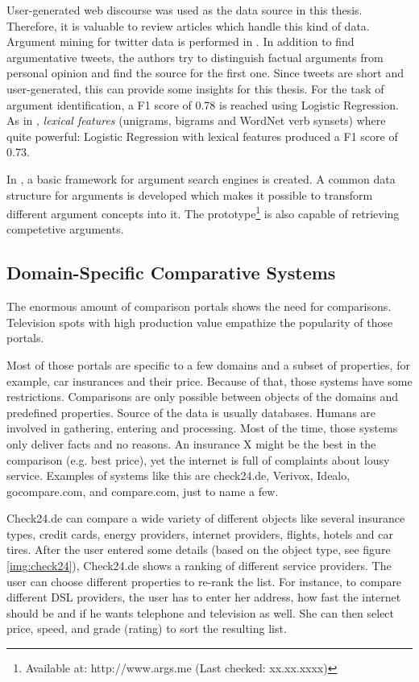 User-generated web discourse was used as the data source in this thesis. Therefore, it is valuable to review articles which handle this kind of data.
Argument mining for twitter data is performed in \cite{Dusmanu2017Argument-Mining}. In addition to find argumentative tweets, the authors try to distinguish factual arguments from personal opinion and find the source for the first one. Since tweets are short and user-generated, this can provide some insights for this thesis. For the task of argument identification, a F1 score of 0.78 is reached using Logistic Regression. As in \cite{Daxenberger2017What-is-the-Ess}, \emph{lexical features} (unigrams, bigrams and WordNet verb synsets) where quite powerful: Logistic Regression with lexical features produced a F1 score of 0.73.\newline

In \cite{Wachsmuth2017Building-an-arg}, a basic framework for argument search engines is created. A common data structure for arguments is developed which makes it possible to transform different argument concepts into it. The prototype\footnote{Available at: http://www.args.me (Last checked: xx.xx.xxxx)} is also capable of retrieving competetive arguments.



\subsection{Domain-Specific Comparative Systems}
The enormous amount of comparison portals shows the need for comparisons. Television spots with high production value empathize the popularity of those portals.

Most of those portals are specific to a few domains and a subset of properties, for example, car insurances and their price. Because of that, those systems have some restrictions. Comparisons are only possible between objects of the domains and predefined properties. Source of the data is usually databases. Humans are involved in gathering, entering and processing. 
Most of the time, those systems only deliver facts and no reasons. An insurance X might be the best in the comparison (e.g. best price), yet the internet is full of complaints about lousy service.
Examples of systems like this are check24.de, Verivox, Idealo, gocompare.com, and compare.com, just to name a few.

Check24.de can compare a wide variety of different objects like several insurance types, credit cards, energy providers, internet providers, flights, hotels and car tires. After the user entered some details (based on the object type, see figure \ref{img:check24}), Check24.de shows a ranking of different service providers. The user can choose different properties to re-rank the list.
For instance, to compare different DSL providers, the user has to enter her address, how fast the internet should be and if he wants telephone and television as well. She can then select price, speed, and grade (rating) to sort the resulting list.

